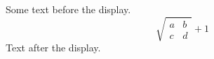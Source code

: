 \documentclass[12pt]{article}
\begin{document}
Some text before the display.
\[ \sqrt{\begin{smallmatrix} a & b \\ c & d \end{smallmatrix}} + 1 \]
Text after the display.
\end{document}
